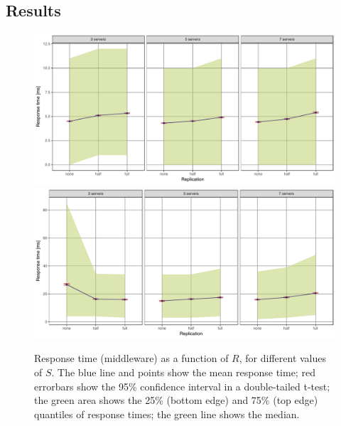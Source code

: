 \documentclass[11pt]{article}
\begin{document}
\subsection{Results}
\label{sec:exp2:res}

\begin{figure}[h]
\centering
\includegraphics[width=\textwidth]{../results/replication/graphs/response_time_vs_replication_get.pdf}
\includegraphics[width=\textwidth]{../results/replication/graphs/response_time_vs_replication_set.pdf}
\caption{Response time (middleware) as a function of $R$, for different values of $S$. The blue line and points show the mean response time; red errorbars show the 95\% confidence interval in a double-tailed t-test; the green area shows the 25\% (bottom edge) and 75\% (top edge) quantiles of response times; the green line shows the median.}
\label{fig:exp2:res:replication}
\end{figure}
\end{document}
